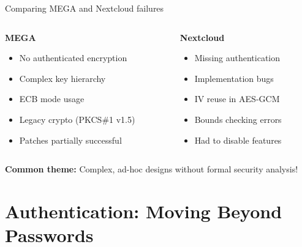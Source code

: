 \documentclass[aspectratio=169, lualatex, handout]{beamer}
\begin{document}
\begin{frame}{Comparing MEGA and Nextcloud failures}
	\begin{columns}
		\begin{column}{0.5\textwidth}
			\textbf{MEGA}
			\vspace{0.3cm}
			\begin{itemize}
				\item No authenticated encryption
				\item Complex key hierarchy
				\item ECB mode usage
				\item Legacy crypto (PKCS\#1 v1.5)
				\item Patches partially successful
			\end{itemize}
		\end{column}
		\begin{column}{0.5\textwidth}
			\textbf{Nextcloud}
			\vspace{0.3cm}
			\begin{itemize}
				\item Missing authentication
				\item Implementation bugs
				\item IV reuse in AES-GCM
				\item Bounds checking errors
				\item Had to disable features
			\end{itemize}
		\end{column}
	\end{columns}
	\vspace{0.5cm}
	\begin{center}
		\textbf{Common theme:} Complex, ad-hoc designs without formal security analysis!
	\end{center}
\end{frame}

\section{Authentication: Moving Beyond Passwords}
\end{document}
